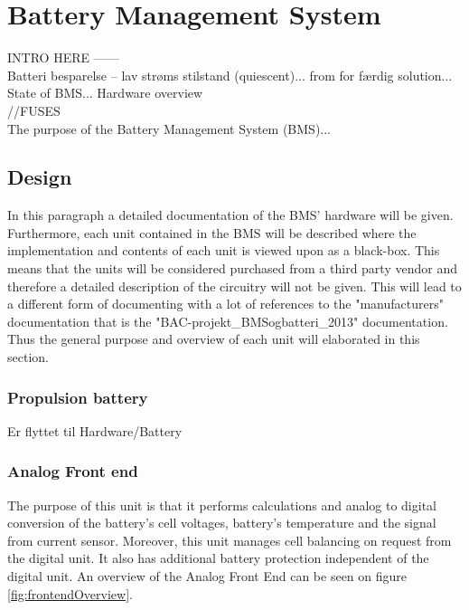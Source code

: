 \section{Battery Management System}
INTRO HERE ------\\
Batteri besparelse -- lav strøms stilstand (quiescent)... from for færdig solution... State of BMS...
Hardware overview \\ 
//FUSES \\
The purpose of the Battery Management System (BMS)...

\subsection{Design}
In this paragraph a detailed documentation of the BMS' hardware will be given. Furthermore, each unit contained in the BMS will be described where the implementation and contents of each unit is viewed upon as a black-box. This means that the units will be considered purchased from a third party vendor and therefore a detailed description of the circuitry will not be given. This will lead to a different form of documenting with a lot of references to the "manufacturers" documentation that is the "BAC-projekt\_BMSogbatteri\_2013"  documentation. Thus the general purpose and overview of each unit will elaborated in this section. 

\subsubsection{Propulsion battery}
Er flyttet til Hardware/Battery 

\subsubsection{Analog Front end}
The purpose of this unit is that it performs calculations and analog to digital conversion of the battery's cell voltages, battery's temperature and the signal from current sensor. Moreover, this unit manages cell balancing on request from the digital unit. It also has additional battery protection independent of the digital unit.
An overview of the Analog Front End can be seen on figure \ref{fig:frontendOverview}.

